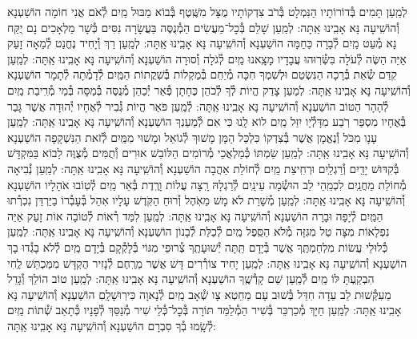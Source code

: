 \documentclass[twoside, openany, parskip=half, 11pt]{book}
\begin{document}
\begin{small}
לְמַֽעַן תָּמִים בְּ֯דוֹרוֹתָיו הַנִּמְלָט בְּ֯רֹב צִדְקוֹתָיו
מֻצָּל מִשֶּֽׁטֶף בְּ֯בוֹא מַבּוּל מַֽיִם לְ֯אֹם אֲנִי חוֹמָה הוֹשַׁעְנָא וְ֯הוֹשִֽׁיעָה נָּא אָבִֽינוּ אַֽתָּה:
לְמַֽעַן שָׁלֵם בְּ֯כׇל־מַעֲשִׂים הַמְ֯נֻסֶּה בַּעֲשָׂרָה נִסִּים
כְּ֯שָׁר מַלְאָכִים נָם יֻקַּח נָא מְ֯עַט מַֽיִם לְ֯בָרָה כַּחַמָּה הוֹשַׁעְנָא וְ֯הוֹשִֽׁיעָה נָּא אָבִֽינוּ אַֽתָּה:
לְמַֽעַן רַךְ וְ֯יָחִיד נֶחֱנַט לְ֯מֵאָה זָעַק אַיֵּה הַשֶּׂה לְ֯עֹלָה
בִּשְּׂ֯רֽוּהוּ עֲבָדָיו מָצָֽאנוּ מַֽיִם לְ֯גֹלָה וְ֯סוּרָה הוֹשַׁעְנָא וְ֯הוֹשִֽׁיעָה נָּא אָבִֽינוּ אַֽתָּה:
לְמַֽעַן קִדַּם שְׂ֯אֵת בְּ֯רָכָה הַנִּשְׂטַם וּלְשִׁמְךָ חִכָּה
מְ֯יַחֵם בְּ֯מַקְלוֹת בְּ֯שִׁקֲתוֹת הַמַּֽיִם לְ֯דָמְ֯תָה לְ֯תָמָר הוֹשַׁעְנָא וְ֯הוֹשִֽׁיעָה נָּא אָבִֽינוּ אַֽתָּה:
לְמַעַן צָדַק הֱיוֹת לְ֯ךָ לְ֯כֹהֵן כֶּחָתָן פְּ֯אֵר יְ֯כַהֵן
מְ֯נֻסֶּה בְּ֯מַסָּה בְּ֯מֵי מְ֯רִֽיבַת מַֽיִם לְ֯הָהָר הַטּוֹב הוֹשַׁעְנָא וְ֯הוֹשִֽׁיעָה נָּא אָבִֽינוּ אַֽתָּה:
לְ֯מַֽעַן פֹּאַר הֱיוֹת גְּ֯בִיר לְ֯אֶחָיו יְ֯הוּדָה אֲשֶׁר גָּבַר בְּ֯אֶחָיו
מִסְפַּר רֹֽבַע מִדָּלְ֯יָו יִזַּל מַֽיִם לוֹא לָֽנוּ כִּי אִם לְ֯מַעַנְךָ הוֹשַׁעְנָא וְ֯הוֹשִֽׁיעָה נָּא אָבִֽינוּ אַֽתָּה:
לְמַֽעַן עָנָו מִכֹּל וְ֯נֶאֱמָן אֲשֶׁר בְּ֯צִדְקוֹ כִּלְכֵּל הַמָּן
מָשׁוּךְ לְ֯גוֹאֵל וּמָשׁוּי מִמַּֽיִם לְ֯זֹאת הַנִּשְׁקָפָה הוֹשַׁעְנָא וְ֯הוֹשִֽׁיעָה נָּא אָבִֽינוּ אַֽתָּה:
לְמַֽעַן שַׂמְתּוֹ כְּ֯מַלְאֲכֵי מְ֯רוֹמִים הַלּוֹבֵשׁ אוּרִים וְ֯תֻמִּים
מְ֯צֻוֶּה לָבוֹא בַּמִּקְדָּשׁ בְּ֯קִדּוּשׁ יָדַֽיִם וְ֯רַגְלַֽיִם וּרְחִֽיצַת מַֽיִם
לְ֯חוֹלַת אַהֲבָה הוֹשַׁעְנָא וְ֯הוֹשִֽׁיעָה נָּא אָבִֽינוּ אַֽתָּה:
לְמַֽעַן נְ֯בִיאָה מְ֯חוֹלַת מַחֲנַֽיִם לִכְמֵֽהֵי לֵב הוּשְׂ֯מָה עֵינַֽיִם
לְ֯רַגְלָהּ רָֽצָה עֲלוֹת וָרֶֽדֶת בְּ֯אֵר מַֽיִם לְ֯טֽוֹבוּ אֹהָלָיו הוֹשַׁעְנָא וְ֯הוֹשִֽׁיעָה נָּא אָבִֽינוּ אַֽתָּה:
לְמַֽעַן מְ֯שָׁרֵת לֹא מָשׁ מֵאֹֽהֶל וְ֯רוּחַ הַקֹּֽדֶשׁ עָלָיו אִהֵל
בְּ֯עָבְ֯רוֹ בַיַּרְדֵּן נִכְרְ֯תוּ הַמַּֽיִם לְ֯יָפָה וּבָרָה הוֹשַׁעְנָא וְ֯הוֹשִֽׁיעָה נָּא אָבִֽינוּ אַֽתָּה:
לְמַֽעַן לִמַּד רְ֯אוֹת לְ֯טוֹבָה אוֹת זָעַק אַיֵּה נִפְלָאוֹת
מִצָּה טַל מִגִּזָּה מְ֯לֹא הַסֵּֽפֶל מַֽיִם לְ֯כַלַּת לְ֯בָנוֹן הוֹשַׁעְנָא וְ֯הוֹשִֽׁיעָה נָּא אָבִֽינוּ אַֽתָּה:
לְמַֽעַן כְּ֯לוּלֵי עֲשׂוֹת מִלְחַמְתֶּֽךָ אֲשֶׁר בְּ֯יָדָם תַּֽתָּה יְ֯שׁוּעָתֶֽךָ
צְ֯רוּפֵי מִגּוֹי בְּ֯לָקְ֯קָם בְּ֯יָדָם מַֽיִם לְ֯לֹא בָגְ֯דוּ בָךְ הוֹשַׁעְנָא וְ֯הוֹשִֽׁיעָה נָּא אָבִֽינוּ אַֽתָּה:
לְמַֽעַן יָחִיד צוֹרְ֯רִים דָּשׁ אֲשֶׁר מֵרֶֽחֶם לְ֯נָזִיר הֻקְדָּשׁ
מִמַּכְתֵּשׁ לֶֽחִי הִבְקַֽעְתָּ לּוֹ מַֽיִם לְ֯מַֽעַן שֵׁם קָדְ֯שֶֽׁךָ הוֹשַׁעְנָא וְ֯הוֹשִֽׁיעָה נָּא אָבִֽינוּ אַֽתָּה:
לְמַֽעַן טוֹב הוֹלֵךְ וְ֯גָדֵל מֵעִקְּ֯שׁוּת לֵב עֵדָה חִדֵּל
בְּ֯שׁוּב עָם מֵחֵטְא צָו שְׁ֯אָב מַֽיִם לְ֯נָאוָה כִּירֽוּשָׁלָֽםִ הוֹשַׁעְנָא וְ֯הוֹשִֽׁיעָה נָּא אָבִֽינוּ אַֽתָּה:
לְמַֽעַן חַיָּךְ מְ֯כַרְכֵּר בְּ֯שִׁיר הַמְ֯לַמֵּד תּוֹרָה בְּ֯כׇל־כְּ֯לֵי שִׁיר
מְ֯נַסֵּךְ לְ֯פָנָיו כְּ֯תָאַב שְׁ֯תוֹת מַֽיִם לְ֯שָֽׂמוּ בְ֯ךָ סִבְרָם הוֹשַׁעְנָא וְ֯הוֹשִֽׁיעָה נָּא אָבִֽינוּ אַֽתָּה:

\end{small}
\end{document}
